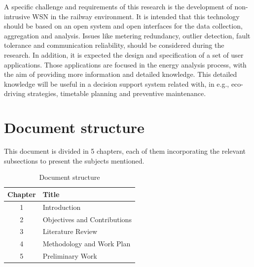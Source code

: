
A specific challenge and requirements of this research is the development of non-intrusive  \ac{WSN}  in the railway environment. 
It is intended that this technology should be based on an open system and open interfaces for the data collection, aggregation and analysis. 
Issues like metering redundancy, outlier detection, fault tolerance and communication reliability, should be considered during the research.
In addition, it is expected the design and specification of a set of user applications.
Those applications are focused in the energy analysis process, with the aim of providing more information and detailed knowledge.
This detailed knowledge will be useful in a decision support system related with, in e.g., eco-driving strategies, timetable planning and preventive maintenance.

\newpage

\section{Document structure}

This document is divided in 5 chapters, each of them incorporating the relevant subsections to present the subjects mentioned. 

\begin{table}[!h]
	\label{tb:struct}
	\centering
	\caption{Document structure}
	\vspace{0.2em}
	\begin{tabular}{c|l}%
		\textbf{Chapter} & \textbf{Title}                    \\ \hline
		1       &                   Introduction             \\ \hline
		2       &                   Objectives and Contributions    \\ \hline
		3       &                   Literature Review    \\ \hline
		4       &                   Methodology and Work Plan       \\ \hline
		5       &                   Preliminary Work       \\
	\end{tabular}
\end{table}
